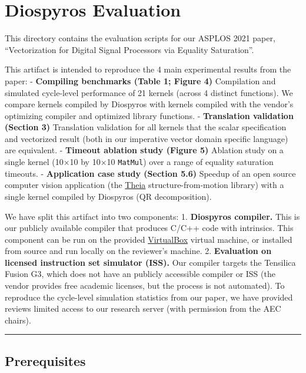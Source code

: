 \hypertarget{diospyros-evaluation}{%
\section{Diospyros Evaluation}\label{diospyros-evaluation}}

This directory contains the evaluation scripts for our ASPLOS 2021
paper, ``Vectorization for Digital Signal Processors via Equality
Saturation''.

This artifact is intended to reproduce the 4 main experimental results
from the paper: - \textbf{Compiling benchmarks (Table 1; Figure 4)}
Compilation and simulated cycle-level performance of 21 kernels (across
4 distinct functions). We compare kernels compiled by Diospyros with
kernels compiled with the vendor's optimizing compiler and optimized
library functions. - \textbf{Translation validation (Section 3)}
Translation validation for all kernels that the scalar specification and
vectorized result (both in our imperative vector domain specific
language) are equivalent. - \textbf{Timeout ablation study (Figure 5)}
Ablation study on a single kernel (10×10 by 10×10 \texttt{MatMul}) over
a range of equality saturation timeouts. - \textbf{Application case
study (Section 5.6)} Speedup of an open source computer vision
application (the \href{https://github.com/sweeneychris/TheiaSfM}{Theia}
structure-from-motion library) with a single kernel compiled by
Diospyros (QR decomposition).

We have split this artifact into two components: 1. \textbf{Diospyros
compiler.} This is our publicly available compiler that produces C/C++
code with intrinsics. This component can be run on the provided
\href{https://www.virtualbox.org/}{VirtualBox} virtual machine, or
installed from source and run locally on the reviewer's machine. 2.
\textbf{Evaluation on licensed instruction set simulator (ISS).} Our
compiler targets the Tensilica Fusion G3, which does not have an
publicly accessible compiler or ISS (the vendor provides free academic
licenses, but the process is not automated). To reproduce the
cycle-level simulation statistics from our paper, we have provided
reviews limited access to our research server (with permission from the
AEC chairs).

\begin{center}\rule{0.5\linewidth}{0.5pt}\end{center}

\hypertarget{prerequisites}{%
\subsection{Prerequisites}\label{prerequisites}}

